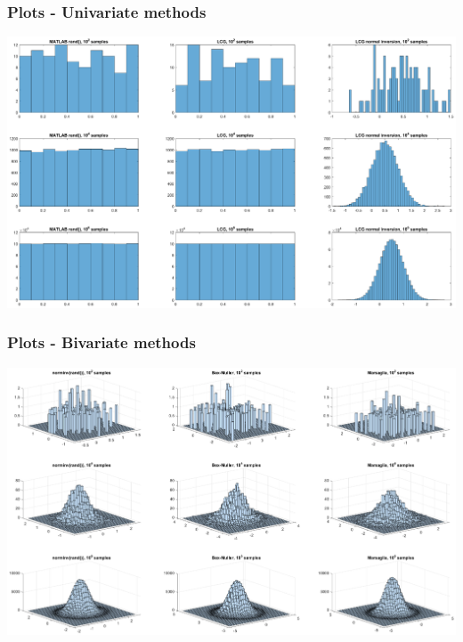 \documentclass[10pt, compress]{beamer}
\begin{document}
\begin{frame}[fragile]
	\frametitle{Plots - Univariate methods}
	\includegraphics[width=\textwidth, trim=70mm 80mm 70mm 20mm]{../univariate.eps}
\end{frame}

\begin{frame}[fragile]
	\frametitle{Plots - Bivariate methods}
	\includegraphics[width=\textwidth, trim=70mm 80mm 70mm 20mm]{../bivariate.eps}
\end{frame}
\end{document}

